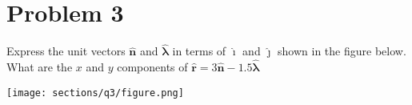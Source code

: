 \section*{Problem 3}

Express the unit vectors \( \mathbf{\hat{n}} \) and \( \mathbf{\hat{\lambda}} \) in terms of \( \mathbf{\hat{\imath}} \) and \( \mathbf{\hat{\jmath}} \) shown in the figure below.
What are the \( x \) and \( y \) components of \( \mathbf{\hat{r}} = 3\mathbf{\hat{n}} - 1.5\mathbf{\hat{\lambda}} \)

\begin{figure*}[h]
    \centering
    \texttt{[image: sections/q3/figure.png]}
\end{figure*}
